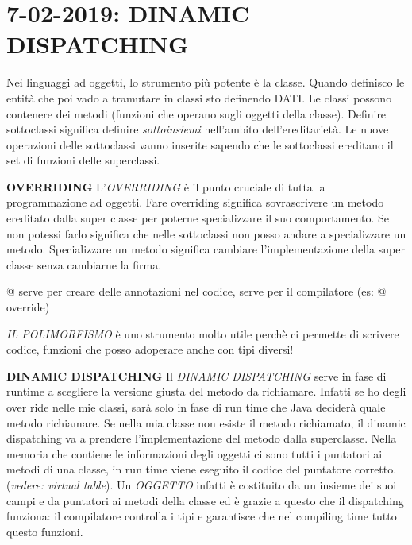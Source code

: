 

\newpage
\section{7-02-2019: DINAMIC DISPATCHING}
Nei linguaggi ad oggetti, lo strumento più potente è la classe. Quando definisco le entità che poi vado a tramutare in classi sto definendo DATI. \newline
Le classi possono contenere dei metodi (funzioni che operano sugli oggetti della classe). \newline
Definire sottoclassi significa definire \textit{sottoinsiemi} nell'ambito dell'ereditarietà. Le nuove operazioni delle sottoclassi vanno inserite sapendo che le sottoclassi ereditano il set di funzioni delle superclassi. 

\noindent \textbf{OVERRIDING} \newline
L'\textit{OVERRIDING} è il punto cruciale di tutta la programmazione ad oggetti. Fare overriding significa sovrascrivere un metodo ereditato dalla super classe per poterne specializzare il suo comportamento. Se non potessi farlo significa che nelle sottoclassi non posso andare a specializzare un metodo. Specializzare un metodo significa cambiare l'implementazione della super classe senza cambiarne la firma. 

\noindent @ serve per creare delle annotazioni nel codice, serve per il compilatore (es: @ override)

\noindent \textit{IL POLIMORFISMO} è uno strumento molto utile perchè ci permette di scrivere codice, funzioni che posso adoperare anche con tipi diversi!

\noindent \textbf{DINAMIC DISPATCHING} \newline
Il \textit{DINAMIC DISPATCHING} serve in fase di runtime a scegliere la versione giusta del metodo da richiamare. Infatti se ho degli over ride nelle mie classi, sarà solo in fase di run time che Java deciderà quale metodo richiamare. Se nella mia classe non esiste il metodo richiamato, il dinamic dispatching va a prendere l'implementazione del metodo dalla superclasse. Nella memoria che contiene le informazioni degli oggetti ci sono tutti i puntatori ai metodi di una classe, in run time viene eseguito il codice del puntatore corretto. (\textit{vedere: virtual table}).
Un \textit{OGGETTO} infatti è costituito da un insieme dei suoi campi e da puntatori ai metodi della classe ed è grazie a questo che il dispatching funziona: il compilatore controlla i tipi e garantisce che nel compiling time tutto questo funzioni. 

